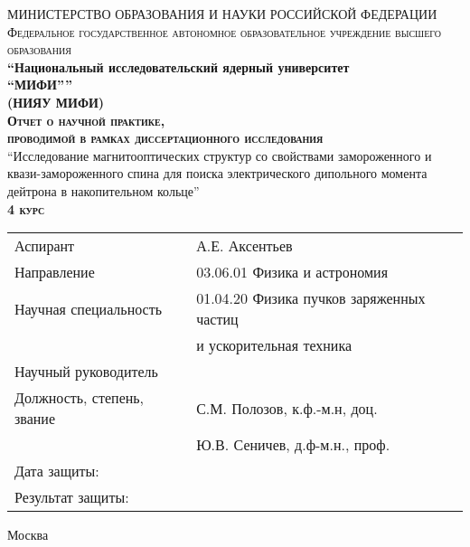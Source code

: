 \begin{titlepage}

\begin{center}
{МИНИСТЕРСТВО ОБРАЗОВАНИЯ И НАУКИ РОССИЙСКОЙ ФЕДЕРАЦИИ}\\[3pt]
\textsc{\small{Федеральное государственное автономное образовательное учреждение высшего образования}}\\

\textbf{\enquote{Национальный исследовательский ядерный университет\\
{``МИФИ''}}}\\
\textbf{(НИЯУ МИФИ)}\\[2cm]




\textsc{\textbf{Отчет о научной практике,\\		
		проводимой в рамках диссертационного исследования}}\\[2cm]

\enquote{Исследование магнитооптических структур со свойствами замороженного и квази-замороженного спина для поиска электрического дипольного момента дейтрона в накопительном кольце}\\[2cm]

\textsc{\textbf{4 курс}}\\[2cm]


\end{center}


\begin{flushleft}
\begin{tabular}{ll}
	Аспирант                   & А.Е. Аксентьев                           \\
	Направление                & 03.06.01 Физика и астрономия             \\
	Научная специальность      & 01.04.20 Физика пучков заряженных частиц \\
	                           & \-\hspace{1.8cm} и ускорительная техника \\[1cm]
	Научный руководитель       &                                          \\
	Должность, степень, звание & С.М. Полозов, к.ф.-м.н, доц.             \\%
	                           & Ю.В. Сеничев, д.ф-м.н., проф.            \\[1cm]
	Дата защиты:               &                                          \\
	Результат защиты:          &
\end{tabular}

\end{flushleft}

\vfill


\begin{center}
Москва \the\year{}
\end{center}



\end{titlepage}
